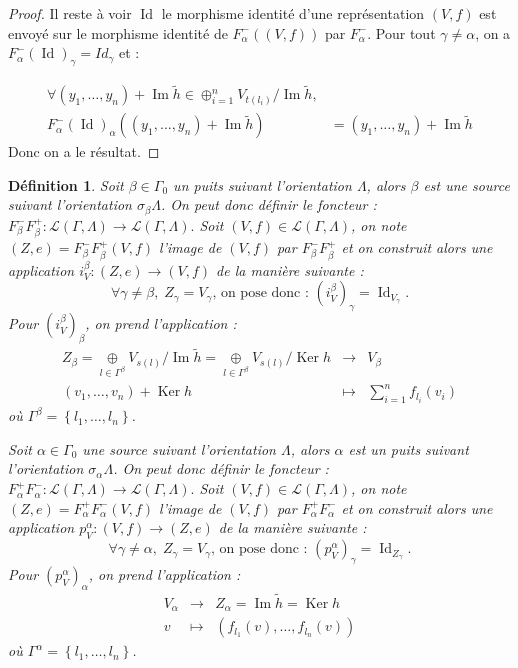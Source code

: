 \documentclass[a4paper,10pt]{article}
\newtheorem{defi}{Définition}[section]
\DeclareMathOperator{\Ker}{Ker}
\DeclareMathOperator{\Id}{Id}
\DeclareMathOperator{\Img}{Im}
\begin{document}
\begin{proof}
 Il reste à voir $\Id$ le morphisme identité d'une représentation $(V,f)$ est envoyé sur le morphisme identité de $F^{-}_{\alpha}((V,f))$ par $F^{-}_{\alpha}$. Pour tout $\gamma \neq \alpha$, on a $F^{-}_{\alpha}(\Id)_{\gamma} = Id_{\gamma}$ et : 

\[
\begin{array}{rl}
  \forall (y_{1}, \dots, y_{n}) + \Img \tilde{h} \in \oplus_{i=1}^{n} V_{t(l_{i})} / \Img \tilde{h},& \\
F^{-}_{\alpha}(\Id)_{\alpha}((y_{1}, \dots, y_{n}) + \Img \tilde{h}) &= (y_{1}, \dots, y_{n}) + \Img \tilde{h}
\end{array}
\]
Donc on a le résultat.
\end{proof}

\begin{defi}
	Soit $\beta\in\Gamma_{0}$ un puits suivant l'orientation $\Lambda$, alors $\beta$ est une source suivant l'orientation $\sigma_{\beta}\Lambda$. On peut donc définir le foncteur : $F_{\beta}^{-}F_{\beta}^{+}:\mathscr{L}(\Gamma,\Lambda)\rightarrow\mathscr{L}(\Gamma,\Lambda).$ Soit $(V,f)\in\mathscr{L}(\Gamma,\Lambda)$, on note $(Z,e)=F_{\beta}^{-}F_{\beta}^{+}(V,f)$ l'image de $(V,f)$ par $F_{\beta}^{-}F_{\beta}^{+}$ et on construit alors une application $i_{V}^{\beta}:(Z,e)\rightarrow (V,f)$ de la manière suivante :
	\[
		\forall \gamma\neq\beta,\;Z_{\gamma}=V_{\gamma}\text{, on pose donc : }(i_{V}^{\beta})_{\gamma}=\Id_{V_{\gamma}}.
	\]
	Pour $(i_{V}^{\beta})_{\beta}$, on prend l'application : 
	\[
	\begin{array}{ccc}
		Z_{\beta}=\underset{l\in\Gamma^{\beta}}{\oplus} V_{s(l)}/\Img \tilde{h}=\underset{l\in\Gamma^{\beta}}{\oplus} V_{s(l)}/\Ker h & \rightarrow & V_{\beta} \\
		(v_{1},\dots,v_{n})+\Ker h & \mapsto & \sum_{i=1}^{n}f_{l_{i}}(v_{i})
	\end{array}
	\]
	où $\Gamma^{\beta}=\left\{ l_{1},\dots,l_{n} \right\}$.

        Soit $\alpha\in\Gamma_{0}$ une source suivant l'orientation $\Lambda$, alors $\alpha$ est un puits suivant l'orientation $\sigma_{\alpha}\Lambda$. On peut donc définir le foncteur : $F_{\alpha}^{+}F_{\alpha}^{-}:\mathscr{L}(\Gamma,\Lambda)\rightarrow\mathscr{L}(\Gamma,\Lambda).$ Soit $(V,f)\in\mathscr{L}(\Gamma,\Lambda)$, on note $(Z,e)=F_{\alpha}^{+}F_{\alpha}^{-}(V,f)$ l'image de $(V,f)$ par $F_{\alpha}^{+}F_{\alpha}^{-}$ et on construit alors une application $p_{V}^{\alpha}:  (V,f)\rightarrow (Z,e)$ de la manière suivante :
	\[
		\forall \gamma\neq\alpha,\;Z_{\gamma}=V_{\gamma}\text{, on pose donc : }(p_{V}^{\alpha})_{\gamma}=\Id_{Z_{\gamma}}.
	\]
	Pour $(p_{V}^{\alpha})_{\alpha}$, on prend l'application : 
	\[
	\begin{array}{ccc}
		 V_{\alpha} & \rightarrow & Z_{\alpha}=\Img \tilde{h}=\Ker h  \\
		v & \mapsto & (f_{l_{1}}(v), \dots, f_{l_{n}}(v))
	\end{array}
	\]
	où $\Gamma^{\alpha}=\left\{ l_{1},\dots,l_{n} \right\}$.
\end{defi}
\end{document}
